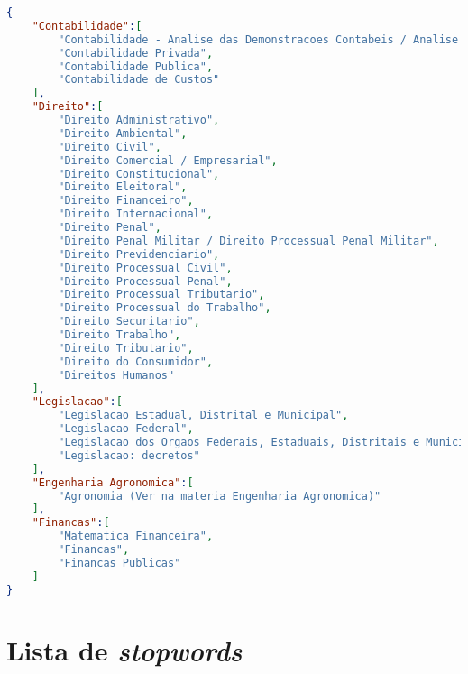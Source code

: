 

\begin{lstlisting}[language=json,firstnumber=1]
{
    "Contabilidade":[
        "Contabilidade - Analise das Demonstracoes Contabeis / Analise de Balanco",
        "Contabilidade Privada",
        "Contabilidade Publica",
        "Contabilidade de Custos"
    ],
    "Direito":[
        "Direito Administrativo",
        "Direito Ambiental",
        "Direito Civil",
        "Direito Comercial / Empresarial",
        "Direito Constitucional",
        "Direito Eleitoral",
        "Direito Financeiro",
        "Direito Internacional",
        "Direito Penal",
        "Direito Penal Militar / Direito Processual Penal Militar",
        "Direito Previdenciario",
        "Direito Processual Civil",
        "Direito Processual Penal",
        "Direito Processual Tributario",
        "Direito Processual do Trabalho",
        "Direito Securitario",
        "Direito Trabalho",
        "Direito Tributario",
        "Direito do Consumidor",
        "Direitos Humanos"
    ],
    "Legislacao":[
        "Legislacao Estadual, Distrital e Municipal",
        "Legislacao Federal",
        "Legislacao dos Orgaos Federais, Estaduais, Distritais e Municipais e dos orgaos Internacionais",
        "Legislacao: decretos"
    ],
    "Engenharia Agronomica":[
        "Agronomia (Ver na materia Engenharia Agronomica)"
    ],
    "Financas":[
        "Matematica Financeira",
        "Financas",
        "Financas Publicas"
    ]
}
\end{lstlisting}


\chapter{Lista de \textit{stopwords}}
\label{stopwords}
\noindent

